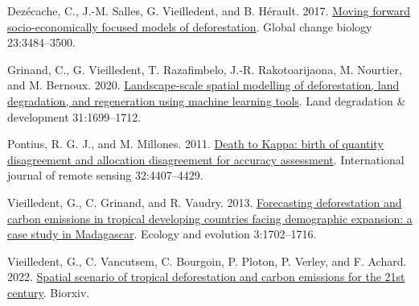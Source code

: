 \documentclass[paper=a4, 12pt, DIV=12]{scrartcl}
\begin{document}
\begin{hangparas}{1.5em}{1}
\hypertarget{citeproc_bib_item_1}{Dezécache, C., J.-M. Salles, G. Vieilledent, and B. Hérault. 2017. \href{https://doi.org/10.1111/gcb.13611}{Moving forward socio-economically focused models of deforestation}. Global change biology 23:3484–3500.}

\hypertarget{citeproc_bib_item_2}{Grinand, C., G. Vieilledent, T. Razafimbelo, J.-R. Rakotoarijaona, M. Nourtier, and M. Bernoux. 2020. \href{https://doi.org/10.1002/ldr.3526}{Landscape-scale spatial modelling of deforestation, land degradation, and regeneration using machine learning tools}. Land degradation \& development 31:1699–1712.}

\hypertarget{citeproc_bib_item_3}{Pontius, R. G. J., and M. Millones. 2011. \href{https://doi.org/10.1080/01431161.2011.552923}{Death to Kappa: birth of quantity disagreement and allocation disagreement for accuracy assessment}. International journal of remote sensing 32:4407–4429.}

\hypertarget{citeproc_bib_item_4}{Vieilledent, G., C. Grinand, and R. Vaudry. 2013. \href{https://doi.org/10.1002/ece3.550}{Forecasting deforestation and carbon emissions in tropical developing countries facing demographic expansion: a case study in Madagascar}. Ecology and evolution 3:1702–1716.}

\hypertarget{citeproc_bib_item_5}{Vieilledent, G., C. Vancutsem, C. Bourgoin, P. Ploton, P. Verley, and F. Achard. 2022. \href{https://doi.org/10.1101/2022.03.22.485306}{Spatial scenario of tropical deforestation and carbon emissions for the 21st century}. Biorxiv.}
\end{hangparas}
\end{document}
